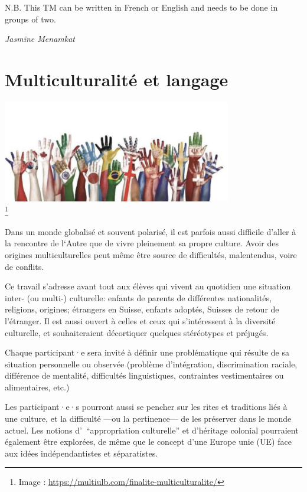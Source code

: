 \documentclass[
  10pt,
  french,
  a5paper,
  openany]{book}
\newenvironment{signature}{\begin{flushright}}{\end{flushright}}
\begin{document}
N.B. This TM can be written in French or English and needs to be done in groups of two.

\begin{signature}
\emph{Jasmine Menamkat}

\end{signature}

\hypertarget{multiculturalituxe9-et-langage}{%
\chapter{Multiculturalité et langage}\label{multiculturalituxe9-et-langage}}

\begin{center}
\includegraphics[width=\textwidth,height=12em]{images/multiculturalite-et-langage.jpg}\\
\footnote{Image : \url{https://multiulb.com/finalite-multiculturalite/}}

\end{center}

Dans un monde globalisé et souvent polarisé, il est parfois aussi difficile d'aller à la rencontre de l`Autre que de vivre pleinement sa propre culture. Avoir des origines multiculturelles peut même être source de difficultés, malentendus, voire de conflits.

Ce travail s'adresse avant tout aux élèves qui vivent au quotidien une situation inter- (ou multi-) culturelle: enfants de parents de différentes nationalités, religions, origines; étrangers en Suisse, enfants adoptés, Suisses de retour de l'étranger.
Il est aussi ouvert à celles et ceux qui s'intéressent à la diversité culturelle, et souhaiteraient décortiquer quelques stéréotypes et préjugés.

Chaque participant·e sera invité à définir une problématique qui résulte de sa situation personnelle ou observée (problème d'intégration, discrimination raciale, différence de mentalité, difficultés linguistiques, contraintes vestimentaires ou alimentaires, etc.)

Les participant·e·s pourront aussi se pencher sur les rites et traditions liés à une culture, et la difficulté ---ou la pertinence--- de les préserver dans le monde actuel. Les notions d'~``appropriation culturelle'' et d'héritage colonial pourraient également être explorées, de même que le concept d'une Europe unie (UE) face aux idées indépendantistes et séparatistes.
\end{document}
